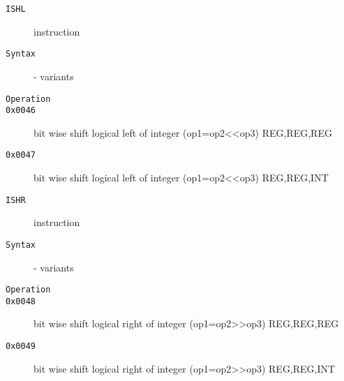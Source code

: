 \begin{description}
\item[\texttt{ISHL}] instruction\\
\item[\texttt{Syntax}] - variants\\

\item[\texttt{Operation}]
\item[\texttt{}]
\item[\texttt{0x0046}] bit wise shift logical left of integer (op1=op2<<op3)  {REG,REG,REG}       \\
\item[\texttt{0x0047}] bit wise shift logical left of integer (op1=op2<<op3)  {REG,REG,INT}       \\
\end{description}
\clearpage
\begin{description}
\item[\texttt{ISHR}] instruction\\
\item[\texttt{Syntax}] - variants\\

\item[\texttt{Operation}]
\item[\texttt{}]
\item[\texttt{0x0048}] bit wise shift logical right of integer (op1=op2>>op3)  {REG,REG,REG}       \\
\item[\texttt{0x0049}] bit wise shift logical right of integer (op1=op2>>op3)  {REG,REG,INT}       \\
\end{description}
\clearpage
